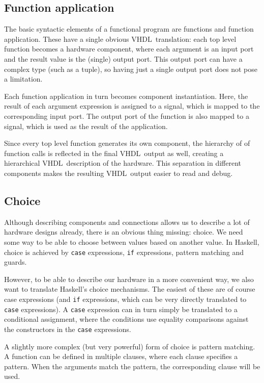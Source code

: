 \documentclass[conference]{IEEEtran}
\def\VHDL{\textsc{VHDL}}
\def\hs#1{\texttt{#1}}
\begin{document}
  \subsection{Function application}
    The basic syntactic elements of a functional program are functions
    and function application. These have a single obvious \VHDL\
    translation: each top level function becomes a hardware component,
    where each argument is an input port and the result value is the
    (single) output port. This output port can have a complex type (such
    as a tuple), so having just a single output port does not pose a
    limitation.

    Each function application in turn becomes component instantiation.
    Here, the result of each argument expression is assigned to a
    signal, which is mapped to the corresponding input port. The output
    port of the function is also mapped to a signal, which is used as
    the result of the application.

    Since every top level function generates its own component, the
    hierarchy of of function calls is reflected in the final \VHDL\
    output as well, creating a hierarchical \VHDL\ description of the
    hardware.  This separation in different components makes the
    resulting \VHDL\ output easier to read and debug.

  \subsection{Choice}
    Although describing components and connections allows us to describe
    a lot of hardware designs already, there is an obvious thing
    missing: choice. We need some way to be able to choose between
    values based on another value.  In Haskell, choice is achieved by
    \hs{case} expressions, \hs{if} expressions, pattern matching and
    guards.

    However, to be able to describe our hardware in a more convenient
    way, we also want to translate Haskell's choice mechanisms. The
    easiest of these are of course case expressions (and \hs{if}
    expressions, which can be very directly translated to \hs{case}
    expressions). A \hs{case} expression can in turn simply be
    translated to a conditional assignment, where the conditions use
    equality comparisons against the constructors in the \hs{case}
    expressions.

    A slightly more complex (but very powerful) form of choice is
    pattern matching. A function can be defined in multiple clauses,
    where each clause specifies a pattern. When the arguments match the
    pattern, the corresponding clause will be used.
\end{document}

